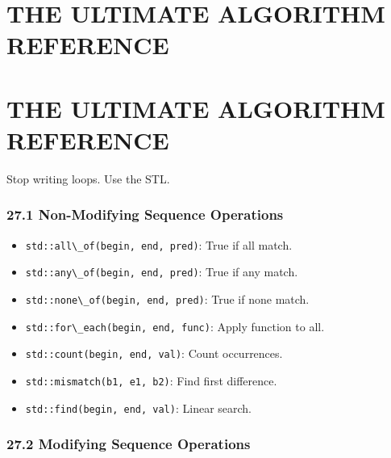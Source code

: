 \hypertarget{the-ultimate-algorithm-reference}{%
\chapter{THE ULTIMATE ALGORITHM
REFERENCE}\label{the-ultimate-algorithm-reference}}

\hypertarget{the-ultimate-algorithm-reference-1}{%
\chapter{THE ULTIMATE ALGORITHM
REFERENCE}\label{the-ultimate-algorithm-reference-1}}

Stop writing loops. Use the STL.

\hypertarget{non-modifying-sequence-operations}{%
\subsection{27.1 Non-Modifying Sequence
Operations}\label{non-modifying-sequence-operations}}

\begin{itemize}
\tightlist
\item
  \passthrough{\lstinline!std::all\_of(begin, end, pred)!}: True if all
  match.
\item
  \passthrough{\lstinline!std::any\_of(begin, end, pred)!}: True if any
  match.
\item
  \passthrough{\lstinline!std::none\_of(begin, end, pred)!}: True if
  none match.
\item
  \passthrough{\lstinline!std::for\_each(begin, end, func)!}: Apply
  function to all.
\item
  \passthrough{\lstinline!std::count(begin, end, val)!}: Count
  occurrences.
\item
  \passthrough{\lstinline!std::mismatch(b1, e1, b2)!}: Find first
  difference.
\item
  \passthrough{\lstinline!std::find(begin, end, val)!}: Linear search.
\end{itemize}

\hypertarget{modifying-sequence-operations}{%
\subsection{27.2 Modifying Sequence
Operations}\label{modifying-sequence-operations}}

